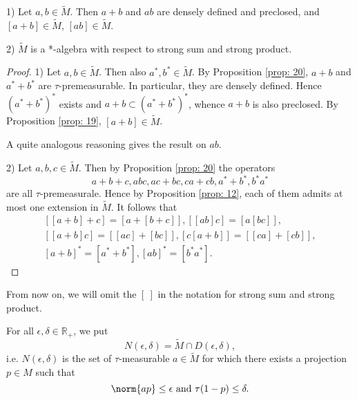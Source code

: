 \begin{proposition}
    1) Let $a,b\in \widetilde{M}$. Then $a+b$ and $ab$ are densely defined and preclosed, and $[a+b]\in \widetilde{M}$, $[ab]\in \widetilde{M}$.\par
    2) $\widetilde{M}$ is a *-algebra with respect to strong sum and strong product. 
\end{proposition}
\begin{proof}
    1) Let $a,b\in \widetilde{M}$. Then also  $a^*,b^*\in \widetilde{M}$. By Proposition \ref{prop: 20}, $a+b$ and $a^*+b^*$ are $\tau$-premeasurable. In particular, they are densely defined. Hence $(a^*+b^*)^*$ exists and $a+b\subset (a^*+b^*)^*$, whence $a+b$ is also preclosed. By Proposition \ref{prop: 19},  $[a+b]\in \widetilde{M}$.\par
A quite analogous reasoning gives the result on $ab$.\par 
2) Let $a,b,c\in \widetilde{M}$. Then by Proposition \ref{prop: 20} the operators 
\[
    a+b+c,abc,ac+bc,ca+cb,a^*+b^*,b^*a^*
\]
are all $\tau$-premeasurale. Hence by Proposition \ref{prop: 12}, each of them admits at most one extension in $\widetilde{M}$. It follows that
\[
    \begin{split}
        [[a+b]+c]=[a+[b+c]],[[ab]c]=[a[bc]],  \\
        [[a+b]c]=[[ac]+[bc]],[c[a+b]]=[[ca]+[cb]],\\
        [a+b]^*=[a^*+b^*],[ab]^*=[b^*a^*].  
    \end{split}
\]
\end{proof}
\begin{notation}
    From now on, we will omit the $[~]$ in the notation for strong sum and strong product. 
\end{notation}
\begin{definition}
    For all $\epsilon,\delta\in \mathbb{R}_+$, we put
    \[
        N(\epsilon,\delta)=\widetilde{M}\cap D(\epsilon,\delta),  
    \]
    i.e. $N(\epsilon,\delta)$ is the set of $\tau$-measurable $a\in \widetilde{M}$ for which there exists a projection $p\in M$ such that 
    \[
        \norm{ap}\leq \epsilon \text{ and } \tau(1-p)\leq \delta.  
    \]
\end{definition}
